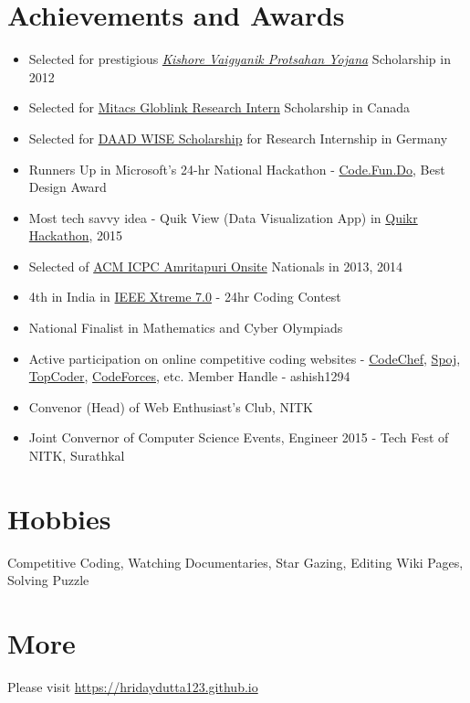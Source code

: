 \documentclass[margin, centered]{res}
\begin{document}
\begin{resume}
\section{Achievements and Awards}
\begin{itemize}[leftmargin=*]
 \item Selected for prestigious \href{http://www.kvpy.org.in/main/}{\emph{Kishore Vaigyanik Protsahan Yojana}} Scholarship in 2012
 \item Selected for \href{https://www.mitacs.ca/en/programs/globalink/globalink-research-internship}{Mitacs Globlink Research Intern} Scholarship in Canada
 \item Selected for \href{https://www.daad.de/deutschland/stipendium/datenbank/en/21148-scholarship-database/?status=1&origin=4&subjectGrps=&daad=1&q=wise&page=1&detail=50015295}{DAAD WISE Scholarship} for Research Internship in Germany
 \item Runners Up in Microsoft's 24-hr National Hackathon - \href{https://www.acadaccelerator.com/}{Code.Fun.Do}, Best Design Award
 \item Most tech savvy idea - Quik View (Data Visualization App) in \href{http://www.venturesity.com/challenge/id/73}{Quikr Hackathon}, 2015
 \item Selected of \href{http://icpc.amrita.ac.in/2014/}{ACM ICPC Amritapuri Onsite} Nationals in 2013, 2014
 \item 4th in India in \href{http://www.ieee.org/membership_services/membership/students/competitions/xtreme/index.html}{IEEE Xtreme 7.0} - 24hr Coding Contest
 \item National Finalist in Mathematics and Cyber Olympiads
 \item Active participation on online competitive coding websites - \href{http://www.codechef.com/users/ashish1294}{CodeChef}, \href{http://www.spoj.com/users/ashish1294/}{Spoj}, \href{http://community.topcoder.com/tc?module=MemberProfile&cr=23303026}{TopCoder}, \href{http://codeforces.com/profile/ashish1294}{CodeForces}, etc. Member Handle - ashish1294
 \item Convenor (Head) of Web Enthusiast's Club, NITK
 \item Joint Convernor of Computer Science Events, Engineer 2015 - Tech Fest of NITK, Surathkal
\end{itemize}


\section{Hobbies}
Competitive Coding, Watching Documentaries, Star Gazing, Editing Wiki Pages, Solving Puzzle

\section{More}
Please visit \href{https://hridaydutta123.github.io}{https://hridaydutta123.github.io}

\end{resume}
\end{document}
